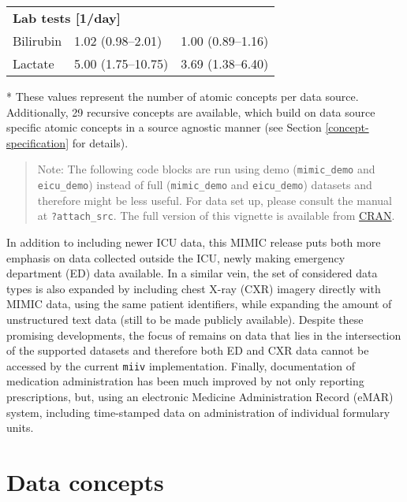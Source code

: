 \documentclass[
  notitle]{jss}
\begin{document}
\begin{table}
\begin{threeparttable}
\begin{tabular}[t]{lll}
\multicolumn{3}{l}{\textbf{Lab tests [1/day]}}\\
\hspace{1em}Bilirubin & 1.02 (0.98--2.01) & 1.00 (0.89--1.16)\\
\hspace{1em}Lactate & 5.00 (1.75--10.75) & 3.69 (1.38--6.40)\\
\bottomrule
\end{tabular}
\begin{tablenotes}
\item[*] These values represent the number of atomic concepts per data source. Additionally, 29 recursive concepts are available, which build on data source specific atomic concepts in a source agnostic manner (see Section \ref{concept-specification} for details).
\end{tablenotes}
\end{threeparttable}
\end{table}

\begin{quote}
Note: The following code blocks are run using demo (\texttt{mimic\_demo}
and \texttt{eicu\_demo}) instead of full (\texttt{mimic\_demo} and
\texttt{eicu\_demo}) datasets and therefore might be less useful. For
data set up, please consult the manual at \texttt{?attach\_src}. The
full version of this vignette is available from
\href{https://CRAN.R-project.org/package=ricu/vignettes/jss.pdf}{CRAN}.
\end{quote}

In addition to including newer ICU data, this MIMIC release puts both
more emphasis on data collected outside the ICU, newly making emergency
department (ED) data available. In a similar vein, the set of considered
data types is also expanded by including chest X-ray (CXR) imagery
directly with MIMIC data, using the same patient identifiers, while
expanding the amount of unstructured text data (still to be made
publicly available). Despite these promising developments, the focus of
 remains on data that lies in the intersection of the
supported datasets and therefore both ED and CXR data cannot be accessed
by the current \texttt{miiv} implementation. Finally, documentation of
medication administration has been much improved by not only reporting
prescriptions, but, using an electronic Medicine Administration Record
(eMAR) system, including time-stamped data on administration of
individual formulary units.

\hypertarget{data-concepts}{%
\section{Data concepts}\label{data-concepts}}
\end{document}
